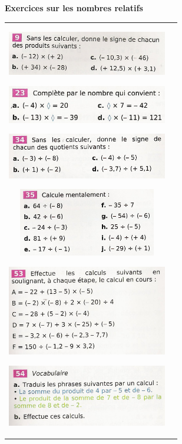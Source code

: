 \documentclass[12pt, twoside]{article}
\begin{document}
\begin{center}
\textbf{Exercices sur les nombres relatifs}
\end{center}


\begin{tabular}{cc}
\begin{minipage}{9cm}

\includegraphics[width=7cm]{images/ex9p15.jpg}

\enskip

\includegraphics[width=7cm]{images/ex23p16.jpg}

\enskip

\includegraphics[width=7cm]{images/ex34p17.jpg}

\enskip

\includegraphics[width=6cm]{images/ex35p17.jpg}


\enskip

\includegraphics[width=7cm]{images/ex53p19.jpg}

\enskip

\includegraphics[width=7cm]{images/ex54p19.jpg}


\end{minipage}
\end{tabular}
\end{document}

